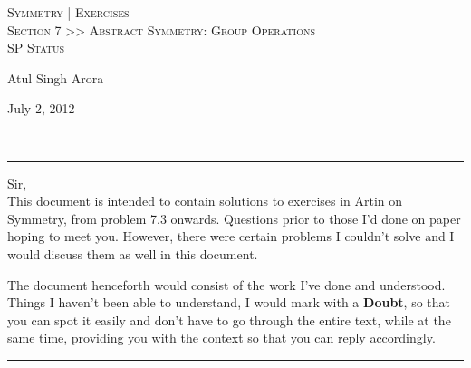 \documentclass[12pt]{article}
\begin{document}



\begin{center}
\textsc{{\huge Symmetry | Exercises\\}
Section 7 >> Abstract Symmetry: Group Operations\\
\small SP Status\\}
\begin{minipage}{0.4\textwidth}
\begin{flushleft} Atul Singh Arora \end{flushleft}
\end{minipage}
\begin{minipage}{0.4\textwidth}
\begin{flushright} {\small July 2, 2012} \end{flushright}
\end{minipage}
\\
\end{center}
\hrule

\vspace{12pt}

Sir,\\
This document is intended to contain solutions to exercises in Artin on Symmetry, from problem 7.3 onwards. Questions prior to those I'd done on paper hoping to meet you. However, there were certain problems I couldn't solve and I would discuss them as well in this document.
\par
The document henceforth would consist of the work I've done and understood. Things I haven't been able to understand, I would mark with a {\bf Doubt}, so that you can spot it easily and don't have to go through the entire text, while at the same time, providing you with the context so that you can reply accordingly.\\
\hrule
\vspace{12pt}
\end{document}

